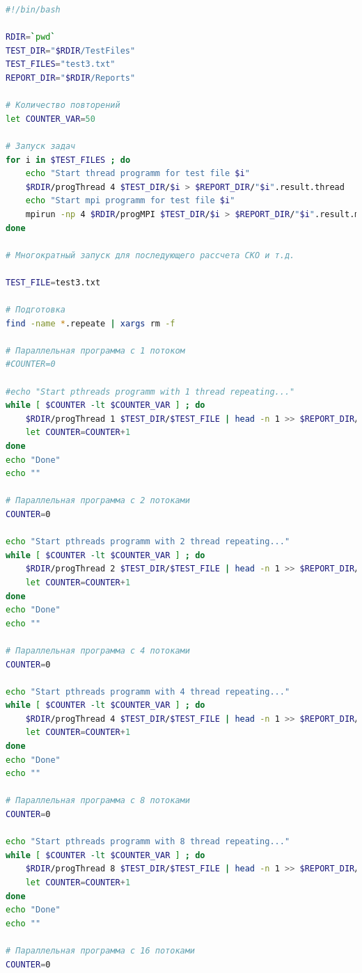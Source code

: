 \documentclass[12pt,a4paper]{report}
\begin{document}
	
				\begin{lstlisting}[language=bash,caption={bash version},texcl=true,
				frame=single,
				breaklines=true,
				extendedchars=\true]
#!/bin/bash

RDIR=`pwd`
TEST_DIR="$RDIR/TestFiles"
TEST_FILES="test3.txt"
REPORT_DIR="$RDIR/Reports"

# Количество повторений
let COUNTER_VAR=50

# Запуск задач
for i in $TEST_FILES ; do
    echo "Start thread programm for test file $i"
    $RDIR/progThread 4 $TEST_DIR/$i > $REPORT_DIR/"$i".result.thread
    echo "Start mpi programm for test file $i"
    mpirun -np 4 $RDIR/progMPI $TEST_DIR/$i > $REPORT_DIR/"$i".result.mpi
done

# Многократный запуск для последующего рассчета СКО и т.д.

TEST_FILE=test3.txt

# Подготовка
find -name *.repeate | xargs rm -f

# Параллельная программа с 1 потоком
#COUNTER=0

#echo "Start pthreads programm with 1 thread repeating..."
while [ $COUNTER -lt $COUNTER_VAR ] ; do
    $RDIR/progThread 1 $TEST_DIR/$TEST_FILE | head -n 1 >> $REPORT_DIR/result.threads.1.repeate
    let COUNTER=COUNTER+1
done
echo "Done"
echo ""

# Параллельная программа с 2 потоками
COUNTER=0

echo "Start pthreads programm with 2 thread repeating..."
while [ $COUNTER -lt $COUNTER_VAR ] ; do
    $RDIR/progThread 2 $TEST_DIR/$TEST_FILE | head -n 1 >> $REPORT_DIR/result.threads.2.repeate
    let COUNTER=COUNTER+1
done
echo "Done"
echo ""

# Параллельная программа с 4 потоками
COUNTER=0

echo "Start pthreads programm with 4 thread repeating..."
while [ $COUNTER -lt $COUNTER_VAR ] ; do
    $RDIR/progThread 4 $TEST_DIR/$TEST_FILE | head -n 1 >> $REPORT_DIR/result.threads.4.repeate
    let COUNTER=COUNTER+1
done
echo "Done"
echo ""

# Параллельная программа с 8 потоками
COUNTER=0

echo "Start pthreads programm with 8 thread repeating..."
while [ $COUNTER -lt $COUNTER_VAR ] ; do
    $RDIR/progThread 8 $TEST_DIR/$TEST_FILE | head -n 1 >> $REPORT_DIR/result.threads.8.repeate
    let COUNTER=COUNTER+1
done
echo "Done"
echo ""

# Параллельная программа с 16 потоками
COUNTER=0


\end{lstlisting}
\end{document}
